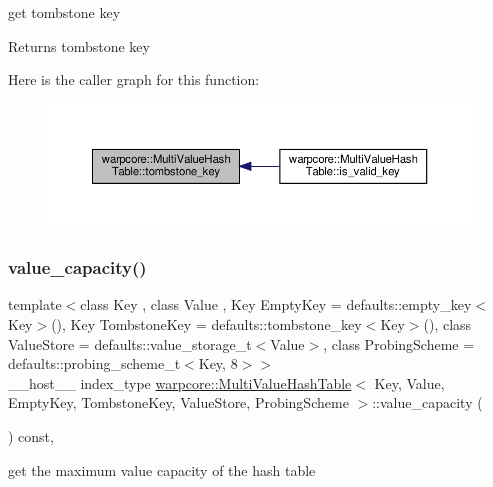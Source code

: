 get tombstone key 

\begin{DoxyReturn}{Returns}
tombstone key 
\end{DoxyReturn}
Here is the caller graph for this function\+:
\nopagebreak
\begin{figure}[H]
\begin{center}
\leavevmode
\includegraphics[width=350pt]{classwarpcore_1_1MultiValueHashTable_a6174c9b15d8772c8fa1874b6415e9937_icgraph}
\end{center}
\end{figure}
\mbox{\label{classwarpcore_1_1MultiValueHashTable_a5e5959606f5446959d56758b957626fa}} 
\subsubsection{\texorpdfstring{value\+\_\+capacity()}{value\_capacity()}}
{\footnotesize\ttfamily template$<$class Key , class Value , Key Empty\+Key = defaults\+::empty\+\_\+key$<$\+Key$>$(), Key Tombstone\+Key = defaults\+::tombstone\+\_\+key$<$\+Key$>$(), class Value\+Store  = defaults\+::value\+\_\+storage\+\_\+t$<$\+Value$>$, class Probing\+Scheme  = defaults\+::probing\+\_\+scheme\+\_\+t$<$\+Key, 8$>$$>$ \\
\+\_\+\+\_\+host\+\_\+\+\_\+ index\+\_\+type \hyperlink{classwarpcore_1_1MultiValueHashTable}{warpcore\+::\+Multi\+Value\+Hash\+Table}$<$ Key, Value, Empty\+Key, Tombstone\+Key, Value\+Store, Probing\+Scheme $>$\+::value\+\_\+capacity (\begin{DoxyParamCaption}{ }\end{DoxyParamCaption}) const\hspace{0.3cm}{\ttfamily [inline]}, {\ttfamily [noexcept]}}



get the maximum value capacity of the hash table 

